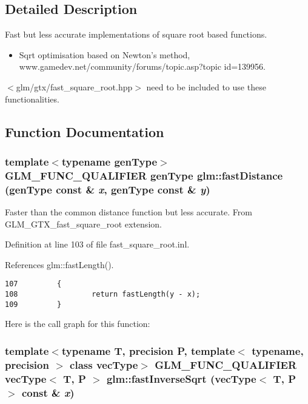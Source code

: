 \subsection{Detailed Description}
Fast but less accurate implementations of square root based functions.\begin{itemize}
\item Sqrt optimisation based on Newton's method, www.gamedev.net/community/forums/topic.asp?topic id=139956. \end{itemize}


$<$glm/gtx/fast\_\-square\_\-root.hpp$>$ need to be included to use these functionalities. 

\subsection{Function Documentation}
\hypertarget{group__gtx__fast__square__root_g38aff4a231786efed3482b015da34b66}{
\subsubsection[fastDistance]{\setlength{\rightskip}{0pt plus 5cm}template$<$typename genType$>$ GLM\_\-FUNC\_\-QUALIFIER genType glm::fastDistance (genType const \& {\em x}, \/  genType const \& {\em y})}}
\label{group__gtx__fast__square__root_g38aff4a231786efed3482b015da34b66}


Faster than the common distance function but less accurate. From GLM\_\-GTX\_\-fast\_\-square\_\-root extension. 

Definition at line 103 of file fast\_\-square\_\-root.inl.

References glm::fastLength().

\begin{Code}\begin{verbatim}107         {
108                 return fastLength(y - x);
109         }
\end{verbatim}
\end{Code}




Here is the call graph for this function:\hypertarget{group__gtx__fast__square__root_ge34c9d81e02deb1042789aa4dc98cfc9}{
\subsubsection[fastInverseSqrt]{\setlength{\rightskip}{0pt plus 5cm}template$<$typename T, precision P, template$<$ typename, precision $>$ class vecType$>$ GLM\_\-FUNC\_\-QUALIFIER vecType$<$ T, P $>$ glm::fastInverseSqrt (vecType$<$ T, P $>$ const \& {\em x})}}
\label{group__gtx__fast__square__root_ge34c9d81e02deb1042789aa4dc98cfc9}


